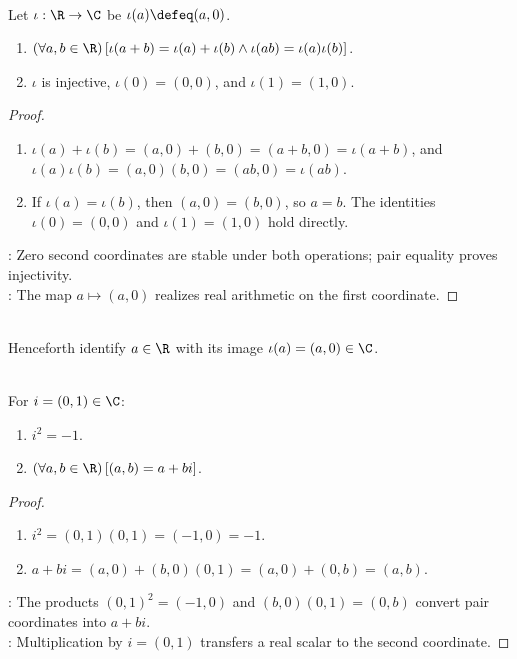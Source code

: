 \begin{proposition} \label{prop:real-field-embedded-in-complex-field} \\
Let $\iota:\R\to\C$ be $\iota(a)\defeq(a,0)$.
\begin{enumerate}[label=(\roman*)]
\setlength{\itemsep}{0pt}
\item $(\forall a,b\in\R)\,[\iota(a+b)=\iota(a)+\iota(b)\land\iota(ab)=\iota(a)\iota(b)]$.
\item $\iota$ is injective, $\iota(0)=(0,0)$, and $\iota(1)=(1,0)$.
\end{enumerate}
\begin{proof}
\begin{enumerate}[label=(\roman*)]
\setlength{\itemsep}{0pt}
\item $\iota(a)+\iota(b)=(a,0)+(b,0)=(a+b,0)=\iota(a+b)$, and $\iota(a)\iota(b)=(a,0)(b,0)=(ab,0)=\iota(ab)$.
\item If $\iota(a)=\iota(b)$, then $(a,0)=(b,0)$, so $a=b$. The identities $\iota(0)=(0,0)$ and $\iota(1)=(1,0)$ hold directly.
\end{enumerate}
: Zero second coordinates are stable under both operations; pair equality proves injectivity.\\
: The map $a\mapsto(a,0)$ realizes real arithmetic on the first coordinate.
\end{proof}
\end{proposition}

\begin{convention} \label{conv:real-subfield-identification-complex-numbers} \\
Henceforth identify $a\in\R$ with its image $\iota(a)=(a,0)\in\C$.
\end{convention}

\begin{proposition} \label{prop:complex-unit-and-coordinate-form} \\
For $i=(0,1)\in\C$:
\begin{enumerate}[label=(\roman*)]
\setlength{\itemsep}{0pt}
\item $i^2=-1$.
\item $(\forall a,b\in\R)\,[(a,b)=a+bi]$.
\end{enumerate}
\begin{proof}
\begin{enumerate}[label=(\roman*)]
\setlength{\itemsep}{0pt}
\item $i^2=(0,1)(0,1)=(-1,0)=-1$.
\item $a+bi=(a,0)+(b,0)(0,1)=(a,0)+(0,b)=(a,b)$.
\end{enumerate}
: The products $(0,1)^2=(-1,0)$ and $(b,0)(0,1)=(0,b)$ convert pair coordinates into $a+bi$.\\
: Multiplication by $i=(0,1)$ transfers a real scalar to the second coordinate.
\end{proof}
\end{proposition}

